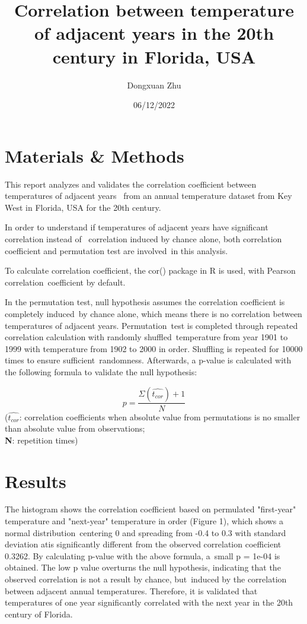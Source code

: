 \documentclass[8pt,notitlepage]{extarticle}
\title{\vspace{-30mm}Correlation between temperature of adjacent years in the 20th century in Florida, USA}
\author{Dongxuan Zhu}
\date{06/12/2022}
\begin{document}
  \maketitle
    \section{Materials \& Methods}

    \par This report analyzes and validates the correlation coefficient between temperatures of adjacent years \
    from an annual temperature dataset from Key West in Florida, USA for the 20th century.  
    \par In order to understand if temperatures of adjacent years have significant correlation instead of \
    correlation induced by chance alone, both correlation coefficient and permutation test are involved\
    in this analysis.
    \par To calculate correlation coefficient, the cor() package in R is used, with Pearson correlation\
    coefficient by default.
    \par In the permutation test, null hypothesis assumes the correlation coefficient is completely induced\
    by chance alone, which means there is no correlation between temperatures of adjacent years. Permutation\
    test is completed through repeated correlation calculation with randomly shuffled\
    temperature from year 1901 to 1999 with temperature from 1902 to 2000 in order. Shuffling is repeated for 10000 times to ensure sufficient\
    randomness. Afterwards, a p-value is calculated with the following formula to validate the null hypothesis:

    
    \begin{equation}
      p = \frac{\Sigma(\hat{t_{cor}})+1}{N}
    \end{equation}
    (\textbf{$\hat{t_{cor}}$}: correlation coefficients when absolute value from permutations is no smaller than absolute value from observations;\\
    \textbf{N}: repetition times)
  
  \section{Results}

  \par The histogram shows the correlation coefficient based on permulated "first-year" temperature and "next-year" temperature in order (Figure 1), which shows a normal distribution\
  centering 0 and spreading from -0.4 to 0.3 with standard deviation atis significantly different from the observed correlation coefficient 0.3262. By calculating p-value with the above formula, a\
  small p = 1e-04 is obtained. The low p value overturns the null hypothesis, indicating that the observed correlation is not a result by chance, but\
  induced by the correlation between adjacent annual temperatures. Therefore, it is validated that temperatures of one year
  significantly correlated with the next year in the 20th century of Florida.
\end{document}
